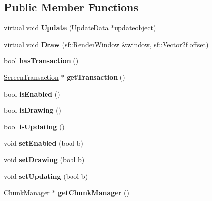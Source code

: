 \subsection*{Public Member Functions}
\begin{DoxyCompactItemize}
\item 
\hypertarget{class_layer_a6db2f37689d5ee4958167e539ab4ce69}{virtual void {\bfseries Update} (\hyperlink{class_update_data}{Update\-Data} $\ast$updateobject)}\label{class_layer_a6db2f37689d5ee4958167e539ab4ce69}

\item 
\hypertarget{class_layer_a008068a5a6bd4dd274bb01bf0246cfaf}{virtual void {\bfseries Draw} (sf\-::\-Render\-Window \&window, sf\-::\-Vector2f offset)}\label{class_layer_a008068a5a6bd4dd274bb01bf0246cfaf}

\item 
\hypertarget{class_layer_a36ea9075da50ba00ce591c365f1df947}{bool {\bfseries has\-Transaction} ()}\label{class_layer_a36ea9075da50ba00ce591c365f1df947}

\item 
\hypertarget{class_layer_a828daf5d76e298c41fbe1d67a680b706}{\hyperlink{class_screen_transaction}{Screen\-Transaction} $\ast$ {\bfseries get\-Transaction} ()}\label{class_layer_a828daf5d76e298c41fbe1d67a680b706}

\item 
\hypertarget{class_layer_a57c59677e3c56a7fd5e3dc985bdb9b4c}{bool {\bfseries is\-Enabled} ()}\label{class_layer_a57c59677e3c56a7fd5e3dc985bdb9b4c}

\item 
\hypertarget{class_layer_a46a91415e6bdc2fdb75ae0ac8498868f}{bool {\bfseries is\-Drawing} ()}\label{class_layer_a46a91415e6bdc2fdb75ae0ac8498868f}

\item 
\hypertarget{class_layer_ac2892b95b2df74446d89e4a6388f0c88}{bool {\bfseries is\-Updating} ()}\label{class_layer_ac2892b95b2df74446d89e4a6388f0c88}

\item 
\hypertarget{class_layer_a68b9de1ac0f3eaa8274b8d0a901a825c}{void {\bfseries set\-Enabled} (bool b)}\label{class_layer_a68b9de1ac0f3eaa8274b8d0a901a825c}

\item 
\hypertarget{class_layer_a0a4f62b4c031e7c2f2d5635ccd38ddd1}{void {\bfseries set\-Drawing} (bool b)}\label{class_layer_a0a4f62b4c031e7c2f2d5635ccd38ddd1}

\item 
\hypertarget{class_layer_a0e0595efe93dbd63b05339f35399d1ad}{void {\bfseries set\-Updating} (bool b)}\label{class_layer_a0e0595efe93dbd63b05339f35399d1ad}

\item 
\hypertarget{class_layer_afbfd549c4d1da2e4a2d78a33586c95e1}{\hyperlink{class_chunk_manager}{Chunk\-Manager} $\ast$ {\bfseries get\-Chunk\-Manager} ()}\label{class_layer_afbfd549c4d1da2e4a2d78a33586c95e1}

\end{DoxyCompactItemize}
